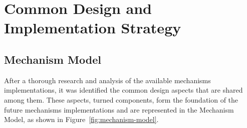 \chapter{Common Design and Implementation Strategy}\label{ch:design-implementation}


\section{Mechanism Model}\label{sec:mechanism-model}

After a thorough research and analysis of the available mechanisms implementations, it was identified the common design aspects that are shared among them.
These aspects, turned components, form the foundation of the future mechanisms implementations and are represented in the Mechanism Model, as shown in Figure~\ref{fig:mechanism-model}.

